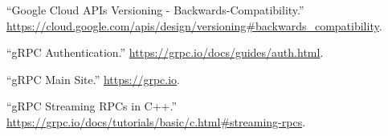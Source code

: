\documentclass[11pt]{article}
\begin{document}
{{\begin{thebibliography}{35}
\mdbibitemlabel{{}[7]}\textquotedblleft{}Google Cloud APIs Versioning - Backwards-Compatibility.\textquotedblright{} \href{https://cloud.google.com/apis/design/versioning\%23backwards_compatibility}{{\ttfamily https://\hspace{0pt}cloud.\hspace{0pt}google.\hspace{0pt}com/\hspace{0pt}apis/\hspace{0pt}design/\hspace{0pt}versioning\#\hspace{0pt}backwards\_\hspace{0pt}compatibility}}.\label{apiversioningbackwardscompatibility}%

\mdbibitemlabel{{}[8]}\textquotedblleft{}gRPC Authentication.\textquotedblright{} \href{https://grpc.io/docs/guides/auth.html}{{\ttfamily https://\hspace{0pt}grpc.\hspace{0pt}io/\hspace{0pt}docs/\hspace{0pt}guides/\hspace{0pt}auth.\hspace{0pt}html}}.\label{grpcauth}%

\mdbibitemlabel{{}[9]}\textquotedblleft{}gRPC Main Site.\textquotedblright{} \href{https://grpc.io}{{\ttfamily https://\hspace{0pt}grpc.\hspace{0pt}io}}.\label{grpc}%

\mdbibitemlabel{{}[10]}\textquotedblleft{}gRPC Streaming RPCs in C++.\textquotedblright{} \href{https://grpc.io/docs/tutorials/basic/c.html\%23streaming-rpcs}{{\ttfamily https://\hspace{0pt}grpc.\hspace{0pt}io/\hspace{0pt}docs/\hspace{0pt}tutorials/\hspace{0pt}basic/\hspace{0pt}c.\hspace{0pt}html\#\hspace{0pt}streaming-\hspace{0pt}rpcs}}.\label{grpcstreamc}%


\end{thebibliography}}}
\end{document}
